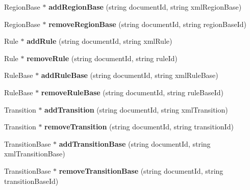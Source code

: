 \begin{CompactItemize}
\item 
RegionBase $\ast$ \textbf{addRegionBase} (string documentId, string xmlRegionBase)\label{classbr_1_1pucrio_1_1telemidia_1_1ginga_1_1ncl_1_1FormatterMediator_933903847ac6104c8c9f3d0593702e09}

\item 
RegionBase $\ast$ \textbf{removeRegionBase} (string documentId, string regionBaseId)\label{classbr_1_1pucrio_1_1telemidia_1_1ginga_1_1ncl_1_1FormatterMediator_40009c2361c7b8102bd01717e2237f2a}

\item 
Rule $\ast$ \textbf{addRule} (string documentId, string xmlRule)\label{classbr_1_1pucrio_1_1telemidia_1_1ginga_1_1ncl_1_1FormatterMediator_0053a0bc9270d05c905d60f9f7541102}

\item 
Rule $\ast$ \textbf{removeRule} (string documentId, string ruleId)\label{classbr_1_1pucrio_1_1telemidia_1_1ginga_1_1ncl_1_1FormatterMediator_ec789db0e3bd130c406bcdccff22b00d}

\item 
RuleBase $\ast$ \textbf{addRuleBase} (string documentId, string xmlRuleBase)\label{classbr_1_1pucrio_1_1telemidia_1_1ginga_1_1ncl_1_1FormatterMediator_c65fd8bb92c284f5502069387e098ea6}

\item 
RuleBase $\ast$ \textbf{removeRuleBase} (string documentId, string ruleBaseId)\label{classbr_1_1pucrio_1_1telemidia_1_1ginga_1_1ncl_1_1FormatterMediator_9cf642a62b77554fd598b148c747da00}

\item 
Transition $\ast$ \textbf{addTransition} (string documentId, string xmlTransition)\label{classbr_1_1pucrio_1_1telemidia_1_1ginga_1_1ncl_1_1FormatterMediator_cf4331acb3a571be6153c6fe08e7d310}

\item 
Transition $\ast$ \textbf{removeTransition} (string documentId, string transitionId)\label{classbr_1_1pucrio_1_1telemidia_1_1ginga_1_1ncl_1_1FormatterMediator_7a85c7c0baab0711707c7e02d2f66cf5}

\item 
TransitionBase $\ast$ \textbf{addTransitionBase} (string documentId, string xmlTransitionBase)\label{classbr_1_1pucrio_1_1telemidia_1_1ginga_1_1ncl_1_1FormatterMediator_604b12ac877a8a71b5ff36b62af708aa}

\item 
TransitionBase $\ast$ \textbf{removeTransitionBase} (string documentId, string transitionBaseId)\label{classbr_1_1pucrio_1_1telemidia_1_1ginga_1_1ncl_1_1FormatterMediator_3bde27cae28f25bba665051caf477ab9}


\end{CompactItemize}
